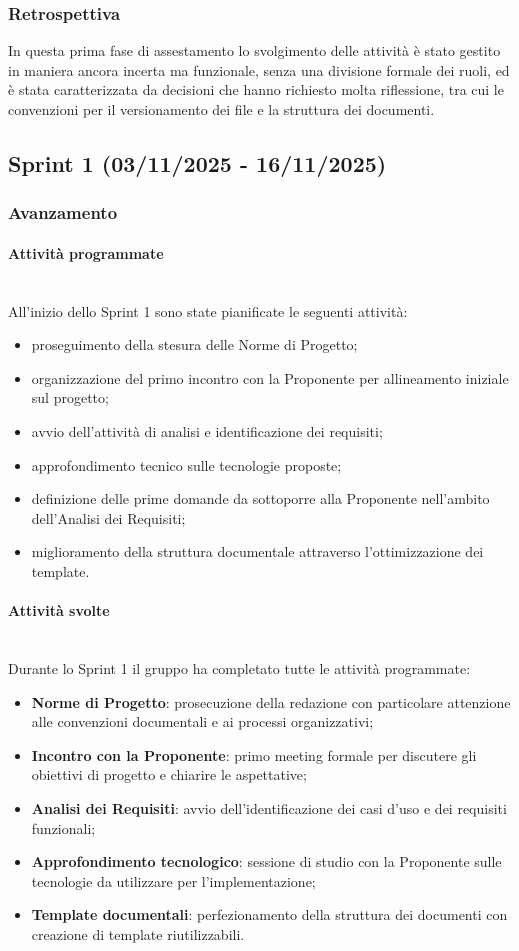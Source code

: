 \documentclass[10pt, letterpaper]{article}
\newcommand{\trisubsection}[1]{\paragraph{#1}\mbox{}\\}
\begin{document}
\subsubsection{Retrospettiva}
In questa prima fase di assestamento lo svolgimento delle attività è stato gestito
in maniera ancora incerta ma funzionale, senza una divisione formale dei ruoli, ed è stata caratterizzata da
decisioni che hanno richiesto molta riflessione, tra cui le convenzioni per il versionamento dei file e la struttura dei documenti.


\subsection{Sprint 1 (03/11/2025 - 16/11/2025)}
\subsubsection{Avanzamento}
\trisubsection{Attività programmate}
All'inizio dello Sprint 1 sono state pianificate le seguenti attività:
\begin{itemize}
    \item proseguimento della stesura delle Norme di Progetto;
    \item organizzazione del primo incontro con la Proponente per allineamento iniziale sul progetto;
    \item avvio dell'attività di analisi e identificazione dei requisiti;
    \item approfondimento tecnico sulle tecnologie proposte;
    \item definizione delle prime domande da sottoporre alla Proponente nell'ambito dell'Analisi dei Requisiti;
    \item miglioramento della struttura documentale attraverso l'ottimizzazione dei template.
\end{itemize}

\trisubsection{Attività svolte}
Durante lo Sprint 1 il gruppo ha completato tutte le attività programmate:
\begin{itemize}
    \item \textbf{Norme di Progetto}: prosecuzione della redazione con particolare attenzione alle convenzioni documentali e ai processi organizzativi;
    \item \textbf{Incontro con la Proponente}: primo meeting formale per discutere gli obiettivi di progetto e chiarire le aspettative;
    \item \textbf{Analisi dei Requisiti}: avvio dell'identificazione dei casi d'uso e dei requisiti funzionali;
    \item \textbf{Approfondimento tecnologico}: sessione di studio con la Proponente sulle tecnologie da utilizzare per l'implementazione;
    \item \textbf{Template documentali}: perfezionamento della struttura dei documenti con creazione di template riutilizzabili.
\end{itemize}
\end{document}
